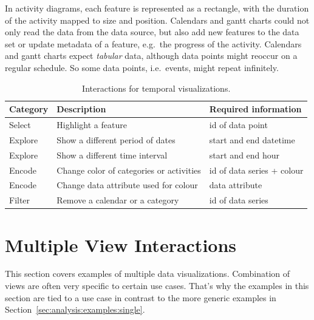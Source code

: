In activity diagrams, each feature is represented as a rectangle, with the duration of the activity mapped to size and position.
Calendars and gantt charts could not only read the data from the data source, but also add new features to the data set or update metadata of a feature, e.g.\ the progress of the activity.
Calendars and gantt charts expect \emph{tabular} data, although data points might reoccur on a regular schedule.
So some data points, i.e.\ events, might repeat infinitely.


\begin{table}
  \caption{Interactions for temporal visualizations.}%
  \label{fig:analysis:temporal:interactions}
  \begin{tabularx}{\linewidth}{lXX}
    \bf Category & \bf Description & \bf Required information \\
    \hline
    Select & Highlight a feature & id of data point \\
    Explore & Show a different period of dates & start and end datetime \\
    Explore & Show a different time interval & start and end hour\\
    Encode & Change color of categories or activities & id of data series + colour \\
    Encode & Change data attribute used for colour & data attribute \\
    Filter & Remove a calendar or a category & id of data series \\
  \end{tabularx}
\end{table}

\section{Multiple View Interactions}\label{sec:analysis:examples:multiple}

This section covers examples of multiple data visualizations.
Combination of views are often very specific to certain use cases.
That's why the examples in this section are tied to a use case in contrast to the more generic examples in Section~\ref{sec:analysis:examples:single}.


